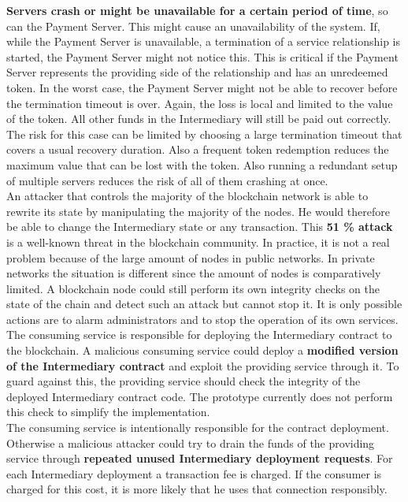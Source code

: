 \documentclass[a4paper,12pt]{scrartcl}
\begin{document}
\textbf{Servers crash or might be unavailable for a certain period of time}, so can the Payment Server. This might cause an unavailability of the system. If, while the Payment Server is unavailable, a termination of a service relationship is started, the Payment Server might not notice this. This is critical if the Payment Server represents the providing side of the relationship and has an unredeemed token. In the worst case, the Payment Server might not be able to recover before the termination timeout is over. Again, the loss is local and limited to the value of the token. All other funds in the Intermediary will still be paid out correctly. The risk for this case can be limited by choosing a large termination timeout that covers a usual recovery duration. Also a frequent token redemption reduces the maximum value that can be lost with the token. Also running a redundant setup of multiple servers reduces the risk of all of them crashing at once.\\

An attacker that controls the majority of the blockchain network is able to rewrite its state by manipulating the majority of the nodes. He would therefore be able to change the Intermediary state or any transaction. This \textbf{51 \% attack} \cite{web27} is a well-known threat in the blockchain community. In practice, it is not a real problem because of the large amount of nodes in public networks. In private networks the situation is different since the amount of nodes is comparatively limited. A blockchain node could still perform its own integrity checks on the state of the chain and detect such an attack but cannot stop it. It is only possible actions are to alarm administrators and to stop the operation of its own services.\\

The consuming service is responsible for deploying the Intermediary contract to the blockchain. A malicious consuming service could deploy a \textbf{modified version of the Intermediary contract} and exploit the providing service through it. To guard against this, the providing service should check the integrity of the deployed Intermediary contract code. The prototype currently does not perform this check to simplify the implementation.\\

The consuming service is intentionally responsible for the contract deployment. Otherwise a malicious attacker could try to drain the funds of the providing service through \textbf{repeated unused Intermediary deployment requests}. For each Intermediary deployment a transaction fee is charged. If the consumer is charged for this cost, it is more likely that he uses that connection responsibly.\\
\end{document}

